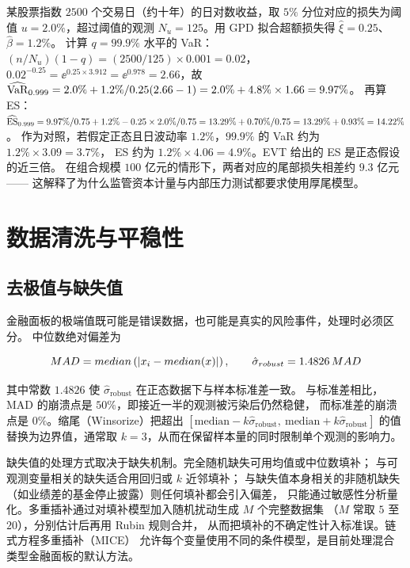 \begin{example}\label{ex:08-evt}
某股票指数 $2500$ 个交易日（约十年）的日对数收益，取 $5\%$ 分位对应的损失为阈值
$u = 2.0\%$，超过阈值的观测 $N_u = 125$。用 GPD 拟合超额损失得
$\hat{\xi} = 0.25$、$\hat{\beta} = 1.2\%$。
计算 $q = 99.9\%$ 水平的 VaR：$(n/N_u)(1-q) = (2500/125)\times 0.001 = 0.02$，
$0.02^{-0.25} = \ee^{0.25\times 3.912} = \ee^{0.978} = 2.66$，故
$\widehat{\operatorname{VaR}}_{0.999} = 2.0\% + 1.2\%/0.25(2.66 - 1) = 2.0\% + 4.8\% \times 1.66 = 9.97\%$。
再算 ES：$\widehat{\operatorname{ES}}_{0.999} = 9.97\%/0.75 + 1.2\% - 0.25\times 2.0\%/0.75
= 13.29\% + 0.70\%/0.75 = 13.29\% + 0.93\% = 14.22\%$。
作为对照，若假定正态且日波动率 $1.2\%$，$99.9\%$ 的 VaR 约为 $1.2\% \times 3.09 = 3.7\%$，
ES 约为 $1.2\% \times 4.06 = 4.9\%$。EVT 给出的 ES 是正态假设的近三倍。
在组合规模 $100$ 亿元的情形下，两者对应的尾部损失相差约 $9.3$ 亿元——
这解释了为什么监管资本计量与内部压力测试都要求使用厚尾模型。
\end{example}

\section{数据清洗与平稳性}

\subsection{去极值与缺失值}

金融面板的极端值既可能是错误数据，也可能是真实的风险事件，处理时必须区分。
中位数绝对偏差为

\begin{equation}
  MAD = median\left(\left\lvert x_i - median(x) \right\rvert\right),
  \qquad \hat{\sigma}_{robust} = 1.4826\,MAD
  \label{eq:08-mad}
\end{equation}

其中常数 $1.4826$ 使 $\hat{\sigma}_{\text{robust}}$ 在正态数据下与样本标准差一致。
与标准差相比，MAD 的崩溃点是 $50\%$，即接近一半的观测被污染后仍然稳健，
而标准差的崩溃点是 $0\%$。缩尾（Winsorize）把超出
$[\mathrm{median} - k\hat{\sigma}_{\text{robust}},\ \mathrm{median} + k\hat{\sigma}_{\text{robust}}]$
的值替换为边界值，通常取 $k = 3$，从而在保留样本量的同时限制单个观测的影响力。

缺失值的处理方式取决于缺失机制。完全随机缺失可用均值或中位数填补；
与可观测变量相关的缺失适合用回归或 $k$ 近邻填补；
与缺失值本身相关的非随机缺失（如业绩差的基金停止披露）则任何填补都会引入偏差，
只能通过敏感性分析量化。多重插补通过对填补模型加入随机扰动生成 $M$ 个完整数据集
（$M$ 常取 $5$ 至 $20$），分别估计后再用 Rubin 规则合并，
从而把填补的不确定性计入标准误。链式方程多重插补（MICE）
允许每个变量使用不同的条件模型，是目前处理混合类型金融面板的默认方法。

